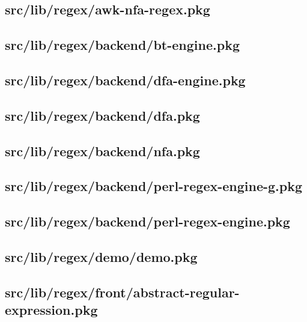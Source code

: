 \subsection{src/lib/regex/awk-nfa-regex.pkg}


\subsection{src/lib/regex/backend/bt-engine.pkg}


\subsection{src/lib/regex/backend/dfa-engine.pkg}


\subsection{src/lib/regex/backend/dfa.pkg}


\subsection{src/lib/regex/backend/nfa.pkg}


\subsection{src/lib/regex/backend/perl-regex-engine-g.pkg}


\subsection{src/lib/regex/backend/perl-regex-engine.pkg}


\subsection{src/lib/regex/demo/demo.pkg}


\subsection{src/lib/regex/front/abstract-regular-expression.pkg}


